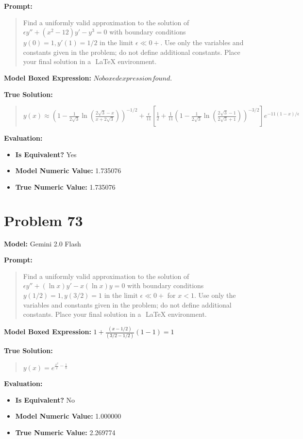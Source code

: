 \documentclass{article}
\begin{document}
{\textbf{Prompt:}
\begin{quote}
Find a uniformly valid approximation to the solution of $\epsilon y'' + (x^2-12)y' - y^3 = 0$ with boundary conditions $y(0)=1, y'(1)=1/2$ in the limit $\epsilon \ll 0+$. Use only the variables and constants given in the problem; do not define additional constants. Place your final solution in a $\boxed{}$ LaTeX environment.
\end{quote}
\textbf{Model Boxed Expression:} $No boxed expression found.$

\textbf{True Solution:}
\begin{quote}
$y(x) \approx \left( 1 - \frac{1}{2\sqrt{3}} \ln\left( \frac{2\sqrt{3}-x}{x+2\sqrt{3}} \right) \right)^{-1/2} + \frac{\epsilon}{11} \left[ \frac{1}{2} + \frac{1}{11} \left( 1 - \frac{1}{2\sqrt{3}} \ln\left( \frac{2\sqrt{3}-1}{2\sqrt{3}+1} \right) \right)^{-3/2} \right] e^{-11(1-x)/\epsilon}$
\end{quote}

\textbf{Evaluation:}
\begin{itemize}
\item \textbf{Is Equivalent?} Yes
\item \textbf{Model Numeric Value:} 1.735076
\item \textbf{True Numeric Value:} 1.735076
\end{itemize}
\vspace{1cm}
\section*{Problem 73}
\textbf{Model:} Gemini 2.0 Flash

\textbf{Prompt:}
\begin{quote}
Find a uniformly valid approximation to the solution of $\epsilon y'' + (\ln x) y' - x(\ln x) y = 0$ with boundary conditions $y(1/2)=1, y(3/2)=1$ in the limit $\epsilon \ll 0+$ for $x<1$. Use only the variables and constants given in the problem; do not define additional constants. Place your final solution in a $\boxed{}$ LaTeX environment.
\end{quote}
\textbf{Model Boxed Expression:} $1 + \frac{(x - 1/2)}{(3/2 - 1/2)}(1-1) = 1$

\textbf{True Solution:}
\begin{quote}
$y(x) = e^{\frac{x^2}{2} - \frac{1}{8}}$
\end{quote}

\textbf{Evaluation:}
\begin{itemize}
\item \textbf{Is Equivalent?} No
\item \textbf{Model Numeric Value:} 1.000000
\item \textbf{True Numeric Value:} 2.269774
\end{itemize}
\vspace{1cm}
}
\end{document}
